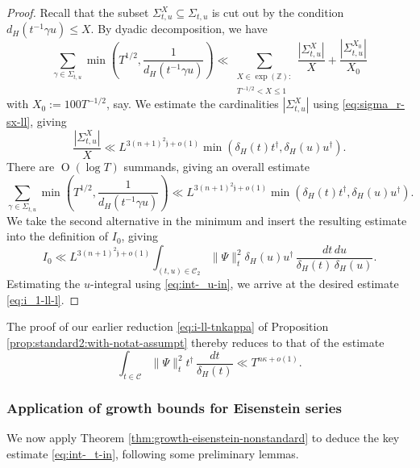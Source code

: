 \documentclass[reqno]{amsart}
\def\O{\operatorname{O}}
\theoremstyle{plain} \newtheorem{theorem} {Theorem}
\theoremstyle{definition} \newtheorem{definition} [theorem] {Definition}
\theoremstyle{itplain} %
\numberwithin{equation}{section}
\numberwithin{theorem}{section}
\renewcommand{\leq}{\leqslant}
\begin{document}
\begin{proof}
Recall that the subset $\Sigma_{t,u}^X \subseteq \Sigma_{t,u}$ is cut out by the condition $d_H(t^{-1} \gamma u) \leq X$.  By dyadic decomposition, we have
\begin{equation*}
  \sum _{\gamma \in \Sigma_{t,u}}
  \min \left( T^{1/2}, \frac{1}{d_H(t^{-1} \gamma u)} \right) \ll  \sum _{
    \substack{
      X \in \exp(\mathbb{Z}) :  \\
      T^{-1/2} < X \leq 1
    }
  }
  \frac{| \Sigma_{t,u}^X|}{X} 
  +
  \frac{|\Sigma_{t,u}^{X_0}|}{X_0}
\end{equation*}
with $X_0 := 100 T^{-1/2}$, say.  We estimate the cardinalities $|\Sigma_{t,u}^X|$ using \eqref{eq:sigma_r-sx-ll}, giving
\begin{equation*}
  \frac{|\Sigma_{t,u}^X|}{X} \ll L ^{3(n+1)^2 \mathfrak{j} + o(1)} \min(\delta_H(t) t^\dagger, \delta_H(u) u ^\dagger).
\end{equation*}
There are $\O(\log T)$ summands, giving an overall estimate
\begin{equation*}
  \sum _{\gamma \in \Sigma_{t,u}}
  \min \left( T^{1/2}, \frac{1}{d_H(t^{-1} \gamma u)} \right)
  \ll L ^{3(n+1)^2\mathfrak{j} + o(1)} \min(\delta_H(t) t^\dagger, \delta_H(u) u ^\dagger).
\end{equation*}
We take the second alternative in the minimum and insert the resulting estimate into the definition of $I_0$, giving
\begin{equation*}
  I_0
  \ll
  L ^{3(n+1)^2 \mathfrak{j} + o(1)}
  \int _{(t, u) \in \mathcal{C}_2 } \|\Psi\|_t^2
  \delta_H(u) u ^\dagger \, \frac{d t \, d u}{\delta_H(t) \, \delta_H(u)}.
\end{equation*}
Estimating the $u$-integral using \eqref{eq:int-_u-in}, we arrive at the desired estimate \eqref{eq:i_1-ll-l}.
\end{proof}

The proof of our earlier reduction \eqref{eq:i-ll-tnkappa} of  Proposition \ref{prop:standard2:with-notat-assumpt} thereby reduces to that of the estimate
\begin{equation}\label{eq:int-_t-in}
  \int _{t \in \mathcal{C} } \|\Psi\|_t^2
  t ^\dagger  \, \frac{d t}{\delta_H(t)}
  \ll
  T^{n \kappa + o(1)}.
\end{equation}

\subsubsection{Application of growth bounds for Eisenstein series}\label{sec:appl-growth-bounds}
We now apply Theorem \ref{thm:growth-eisenstein-nonstandard} to deduce the key estimate \eqref{eq:int-_t-in}, following some preliminary lemmas.
\end{document}
